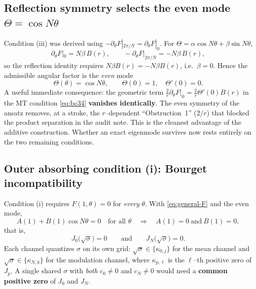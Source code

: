 \documentclass{article}
\begin{document}
\subsection{Reflection symmetry selects the even mode $\Theta=\cos N\theta$}

Condition (iii) was derived using
$-\partial_\theta F|_{2\pi/N}=\partial_\theta F|_{0}$. For
$\Theta=\alpha\cos N\theta+\beta\sin N\theta$,
\[
\partial_\theta F|_{0}=N\beta\,B(r),
\qquad
-\partial_\theta F|_{2\pi/N}=-N\beta\,B(r),
\]
so the reflection identity requires $N\beta B(r)=-N\beta B(r)$, i.e.\
$\beta=0$. Hence the admissible angular factor is the \emph{even} mode
\begin{equation}
\boxed{\,\Theta(\theta)=\cos N\theta,\qquad \Theta(0)=1,\quad \Theta'(0)=0.\,}
\label{eq:even-mode}
\end{equation}
A useful immediate consequence: the geometric term $\tfrac{2}{r}\partial_\theta
F|_0=\tfrac{2}{r}\Theta'(0)B(r)$ in the MT condition \eqref{eq:bc34}
\textbf{vanishes identically}. The even symmetry of the ansatz removes, at a
stroke, the $r$--dependent ``Obstruction~1'' ($2/r$) that blocked the product
separation in the audit note. This is the cleanest advantage of the additive
construction. Whether an exact eigenmode survives now rests entirely on the two
remaining conditions.

\subsection{Outer absorbing condition (i): Bourget incompatibility}

Condition (i) requires $F(1,\theta)=0$ for \emph{every} $\theta$. With
\eqref{eq:general-F} and the even mode,
\begin{equation}
A(1)+B(1)\cos N\theta=0\quad\text{for all }\theta
\quad\Longrightarrow\quad
A(1)=0\ \text{and}\ B(1)=0,
\end{equation}
that is,
\begin{equation}
J_0\!\bigl(\sqrt\sigma\bigr)=0
\qquad\text{and}\qquad
J_N\!\bigl(\sqrt\sigma\bigr)=0 .
\label{eq:bothzero}
\end{equation}
Each channel quantizes $\sigma$ on its own grid: $\sqrt\sigma\in\{\kappa_{0,j}\}$
for the mean channel and $\sqrt\sigma\in\{\kappa_{N,k}\}$ for the modulation
channel, where $\kappa_{p,\ell}$ is the $\ell$--th positive zero of $J_p$. A
single shared $\sigma$ with \emph{both} $c_0\neq0$ and $c_N\neq0$ would need a
\textbf{common positive zero} of $J_0$ and $J_N$.
\end{document}
